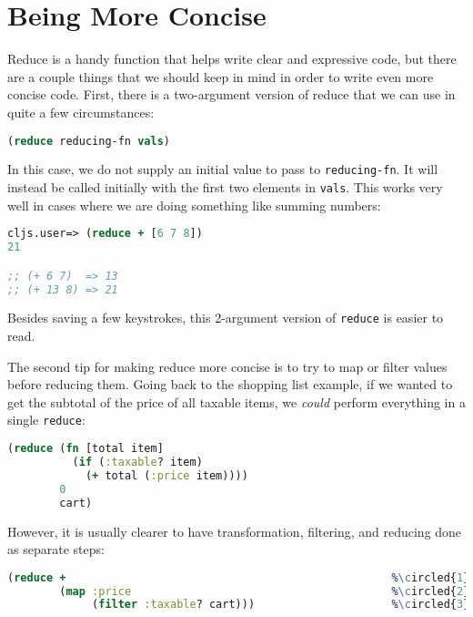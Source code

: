 \documentclass[10pt,twoside,openright]{memoir}
\newcommand*\circled[1]{\tikz[baseline=(char.base)]{
            \node[shape=circle,draw,inner sep=1pt] (char) {#1};}}
\begin{document}
\section{Being More Concise}

Reduce is a handy function that helps write clear and expressive code,
but there are a couple things that we should keep in mind in order to
write even more concise code. First, there is a two-argument version of
reduce that we can use in quite a few circumstances:

\begin{lstlisting}[language=Clojure]
(reduce reducing-fn vals)
\end{lstlisting}

In this case, we do not supply an initial value to pass to
\texttt{reducing-fn}. It will instead be called initially with the first
two elements in \texttt{vals}. This works very well in cases where we
are doing something like summing numbers:

\begin{lstlisting}[language=Clojure]
cljs.user=> (reduce + [6 7 8])
21

;; (+ 6 7)  => 13
;; (+ 13 8) => 21
\end{lstlisting}

Besides saving a few keystrokes, this 2-argument version of
\texttt{reduce} is easier to read.

The second tip for making reduce more concise is to try to map or filter
values before reducing them. Going back to the shopping list example, if
we wanted to get the subtotal of the price of all taxable items, we
\emph{could} perform everything in a single \texttt{reduce}:

\begin{lstlisting}[language=Clojure]
(reduce (fn [total item]
          (if (:taxable? item)
            (+ total (:price item))))
        0
        cart)
\end{lstlisting}

However, it is usually clearer to have transformation, filtering, and
reducing done as separate steps:

\begin{lstlisting}[language=Clojure]
(reduce +                                                  %\circled{1}%
        (map :price                                        %\circled{2}%
             (filter :taxable? cart)))                     %\circled{3}%
\end{lstlisting}
\end{document}
